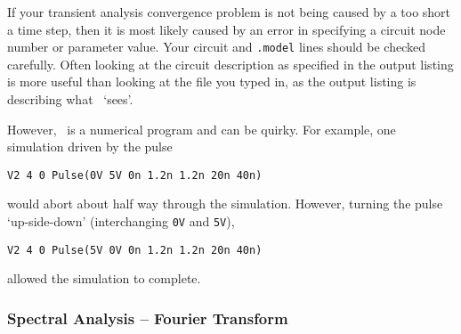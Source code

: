 If your transient analysis convergence problem is not being caused
by a too short a time step, then it is most likely caused by
an error in specifying
a circuit node number or parameter value.  Your circuit and {\tt .model}
lines should be checked carefully.  Often looking at the circuit
description as specified in the output listing
is more useful than looking at the file you typed in, as the output
listing is describing what \spice\ `sees'.

However, \spice\ is a numerical program and can be quirky.  For example,
one simulation driven by the pulse
\begin{center}
{\tt V2 4 0 Pulse(0V 5V 0n 1.2n 1.2n 20n 40n)}
\end{center}
would abort about half way through the simulation.
However, turning the pulse `up-side-down' (interchanging {\tt 0V} and {\tt 5V}),
\begin{center}
{\tt V2 4 0 Pulse(5V 0V 0n 1.2n 1.2n 20n 40n)}
\end{center}
allowed the simulation to complete.

\subsubsection{Spectral Analysis -- Fourier Transform}

